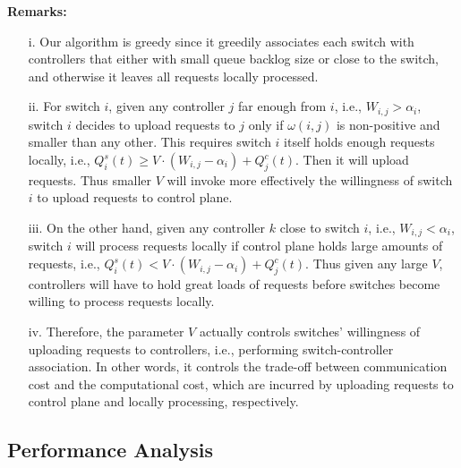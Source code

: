 \documentclass[10pt,journal,compsoc]{IEEEtran}
\begin{document}
\textbf{Remarks:} 
\begin{enumerate}
  \item[i.] Our algorithm is greedy since it greedily associates each switch with controllers that either with small queue backlog size or close to the switch, and otherwise it leaves all requests locally processed.
  \item[ii.] For switch $i$, given any controller $j$ far enough from $i$, i.e., $W_{i,j} > \alpha_i$, switch $i$ decides to upload requests to $j$ only if $\omega(i,j)$ is non-positive and smaller than any other. This requires switch $i$ itself holds enough requests locally, i.e., $Q^s_i(t) \ge V \cdot \left( W_{i,j} - \alpha_i \right) + Q^c_j(t)$. Then it will upload requests. Thus smaller $V$ will invoke more effectively the willingness of switch $i$ to upload requests to control plane.
  \item[iii.] On the other hand, given any controller $k$ close to switch $i$, i.e., $W_{i,j} < \alpha_i$, switch $i$ will process requests locally if control plane holds large amounts of requests, i.e., $Q^s_i(t) < V \cdot \left( W_{i,j} - \alpha_i \right) + Q^c_j(t)$. Thus given any large $V$, controllers will have to hold great loads of requests before switches become willing to process requests locally.
  \item[iv.] Therefore, the parameter $V$ actually controls switches' willingness of uploading requests to controllers, i.e., performing switch-controller association. In other words, it controls the trade-off between communication cost and the computational cost, which are incurred by uploading requests to control plane and locally processing, respectively. 
\end{enumerate}

\subsection{Performance Analysis}
\end{document}
